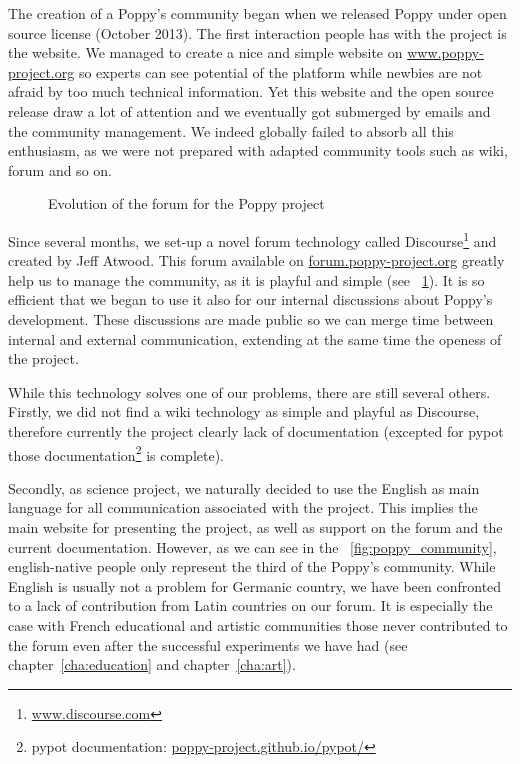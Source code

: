 The creation of a Poppy's community began when we released Poppy under open source license (October 2013).
The first interaction people has with the project is the website. We managed to create a nice and simple website on \url{www.poppy-project.org} so experts can see potential of the platform while newbies are not afraid by too much technical information.
Yet this website and the open source release draw a lot of attention and we eventually got submerged by emails and the community management. We indeed globally failed to absorb all this enthusiasm, as we were not prepared with adapted community tools such as wiki, forum and so on.

\begin{figure}[tb]
\centering
    \hfil
    \caption{Evolution of the forum for the Poppy project}
    \label{fig:poppy_forum}
\end{figure}

Since several months, we set-up a novel forum technology called Discourse\footnote{\url{www.discourse.com}} and created by Jeff Atwood. This forum available on \url{forum.poppy-project.org} greatly help us to manage the community, as it is playful and simple (see \figurename~\ref{fig:poppy_forum}). It is so efficient that we began to use it also for our internal discussions about Poppy's development. These discussions are made public so we can merge time between internal and external communication, extending at the same time the openess of the project.

While this technology solves one of our problems, there are still several others. Firstly, we did not find a wiki technology as simple and playful as Discourse, therefore currently the project clearly lack of documentation (excepted for pypot those documentation\footnote{pypot documentation: \url{poppy-project.github.io/pypot/}} is complete).

Secondly, as science project, we naturally decided to use the English as main language for all communication associated with the project. This implies the main website for presenting the project, as well as support on the forum and the current documentation. However, as we can see in the \figurename~\ref{fig:poppy_community}, english-native people only represent the third of the Poppy's community. While English is usually not a problem for Germanic country, we have been confronted to a lack of contribution from Latin countries on our forum. It is especially the case with French educational and artistic communities those never contributed to the forum even after the successful experiments we have had (see chapter~\ref{cha:education} and chapter~\ref{cha:art}).

